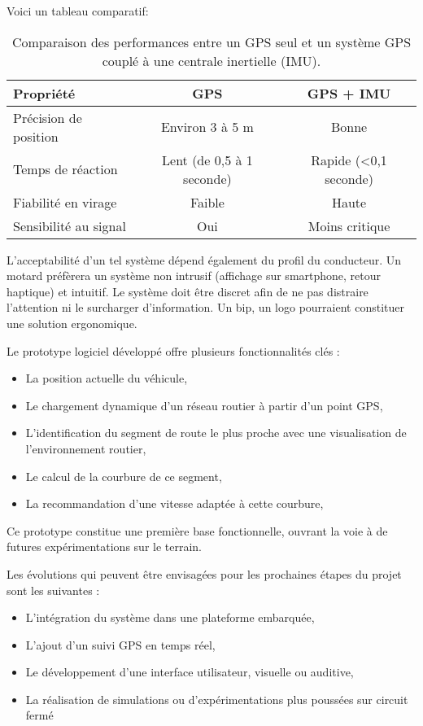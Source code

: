 \vspace{0.5cm}
Voici un tableau comparatif:
\begin{table}[h!]
\centering
\begin{tabular}{|p{4.5cm}|c|c|}
\hline
\textbf{Propriété} & \textbf{GPS} & \textbf{GPS + IMU} \\
\hline
Précision de position & Environ 3 à 5 m & Bonne \\
Temps de réaction & Lent (de 0,5 à 1 seconde) & Rapide (<0,1 seconde) \\
Fiabilité en virage & Faible & Haute \\
Sensibilité au signal & Oui & Moins critique \\
\hline
\end{tabular}
\caption{Comparaison des performances entre un GPS seul et un système GPS couplé à une centrale inertielle (IMU).}
\label{tab:gps-vs-imu}
\end{table}

L’acceptabilité d’un tel système dépend également du profil du conducteur. Un motard préfèrera un système non intrusif (affichage sur smartphone, retour haptique) et intuitif. Le système doit être discret afin de ne pas distraire l’attention ni le surcharger d’information. Un bip, un logo pourraient constituer une solution ergonomique.


Le prototype logiciel développé offre plusieurs fonctionnalités clés :
\begin{itemize}
  \item La position actuelle du véhicule,
  \item Le chargement dynamique d’un réseau routier à partir d’un point GPS,
  \item L’identification du segment de route le plus proche avec une visualisation de l’environnement routier,
  \item Le calcul de la courbure de ce segment,
  \item La recommandation d’une vitesse adaptée à cette courbure,
\end{itemize}
Ce prototype constitue une première base fonctionnelle, ouvrant la voie à de futures expérimentations sur le terrain.

Les évolutions qui peuvent être envisagées pour les prochaines étapes du projet sont les suivantes :
\begin{itemize}
  \item L’intégration du système dans une plateforme embarquée,
  \item L’ajout d’un suivi GPS en temps réel,
  \item Le développement d’une interface utilisateur, visuelle ou auditive,
  \item La réalisation de simulations ou d’expérimentations plus poussées sur circuit fermé
\end{itemize}

